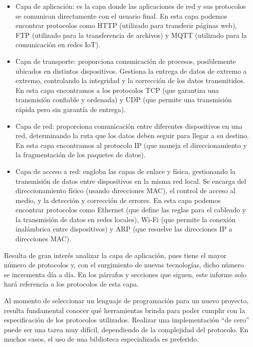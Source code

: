 \documentclass[11pt]{article}
\begin{document}
\begin{itemize}
    \item Capa de aplicación: es la capa donde las aplicaciones de red y sus protocolos se comunican directamente con el usuario final. En esta capa podemos encontrar protocolos como HTTP (utilizado para transferir páginas web), FTP (utilizado para la transferencia de archivos) y MQTT (utilizado para la comunicación en redes IoT).
    \item Capa de transporte: proporciona comunicación de procesos, posiblemente ubicados en distintos dispositivos. Gestiona la entrega de datos de extremo a extremo, controlando la integridad y la corrección de los datos transmitidos. En esta capa encontramos a los protocolos TCP (que garantiza una transmisión confiable y ordenada) y UDP (que permite una transmisión rápida pero sin garantía de entrega).
    \item Capa de red: proporciona comunicación entre diferentes dispositivos en una red, determinando la ruta que los datos deben seguir para llegar a su destino. En esta capa encontramos al protocolo IP (que maneja el direccionamiento y la fragmentación de los paquetes de datos).
    \item Capa de acceso a red: engloba las capas de enlace y física, gestionando la transmisión de datos entre dispositivos en la misma red local. Se encarga del direccionamiento físico (usando direcciones MAC), el control de acceso al medio, y la detección y corrección de errores. En esta capa podemos encontrar protocolos como Ethernet (que define las reglas para el cableado y la transmisión de datos en redes locales), Wi-Fi (que permite la conexión inalámbrica entre dispositivos) y ARP (que resuelve las direcciones IP a direcciones MAC).
\end{itemize}

Resulta de gran interés analizar la capa de aplicación, pues tiene el mayor número de protocolos y, con el surgimiento de nuevas tecnologías, dicho número se incrementa día a día. En los párrafos y secciones que siguen, este informe solo hará referencia a los protocolos de esta capa.

Al momento de seleccionar un lenguaje de programación para un nuevo proyecto, resulta fundamental conocer qué herramientas brinda para poder cumplir con la especificación de los protocolos utilizados. Realizar una implementación ``de cero'' puede ser una tarea muy difícil, dependiendo de la complejidad del protocolo. En muchos casos, el uso de una biblioteca especializada es preferido.
\end{document}
